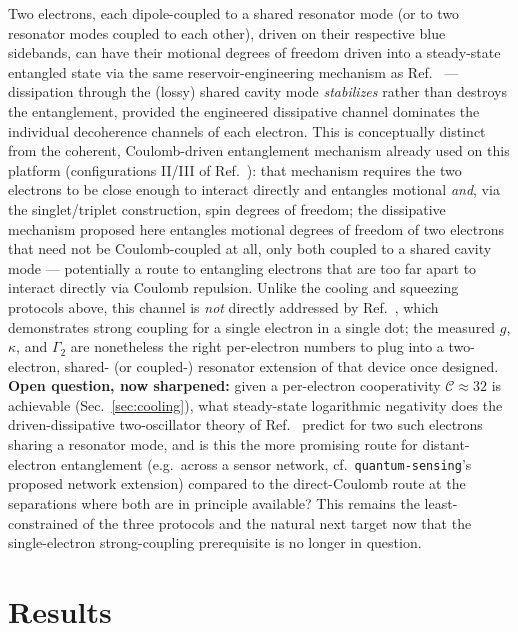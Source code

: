 \documentclass[aps,prapplied,reprint,superscriptaddress,longbibliography]{revtex4-2}
\begin{document}
Two electrons, each dipole-coupled to a shared resonator mode (or to two resonator modes coupled to
each other), driven on their respective blue sidebands, can have their motional degrees of freedom
driven into a steady-state entangled state via the same reservoir-engineering mechanism as
Ref.~\cite{ockeloenkorppi2018stabilized} — dissipation through the (lossy) shared cavity mode
\emph{stabilizes} rather than destroys the entanglement, provided the engineered dissipative
channel dominates the individual decoherence channels of each electron. This is conceptually
distinct from the coherent, Coulomb-driven entanglement mechanism already used on this platform
(configurations II/III of Ref.~\cite{beysengulov2024}): that mechanism requires the two electrons to
be close enough to interact directly and entangles motional \emph{and}, via the singlet/triplet
construction, spin degrees of freedom; the dissipative mechanism proposed here entangles motional
degrees of freedom of two electrons that need not be Coulomb-coupled at all, only both coupled to a
shared cavity mode — potentially a route to entangling electrons that are too far apart to interact
directly via Coulomb repulsion. Unlike the cooling and squeezing protocols above, this channel is
\emph{not} directly addressed by Ref.~\cite{koolstra2026strong}, which demonstrates strong coupling
for a single electron in a single dot; the measured $g$, $\kappa$, and $\Gamma_2$ are nonetheless the
right per-electron numbers to plug into a two-electron, shared- (or coupled-) resonator extension of
that device once designed. \textbf{Open question, now sharpened:} given a per-electron cooperativity
$\mathcal{C}\approx32$ is achievable (Sec.~\ref{sec:cooling}), what steady-state logarithmic
negativity does the driven-dissipative two-oscillator theory of
Ref.~\cite{ockeloenkorppi2018stabilized} predict for two such electrons sharing a resonator mode, and
is this the more promising route for distant-electron entanglement (e.g.\ across a sensor network,
cf.\ \texttt{quantum-sensing}'s proposed network extension) compared to the direct-Coulomb route at
the separations where both are in principle available? This remains the least-constrained of the
three protocols and the natural next target now that the single-electron strong-coupling prerequisite
is no longer in question.

\section{Results}
\end{document}
